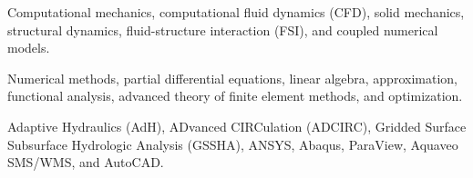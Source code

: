 \documentclass[letterpaper,10pt]{article}
\begin{document}
      \resumeItemListEnd

      \resumeItemListStart
          {Computational mechanics, computational fluid dynamics (CFD), solid
          mechanics, structural dynamics, fluid-structure interaction (FSI), and
          coupled numerical models.}

          {Numerical methods, partial differential equations, linear algebra,
          approximation, functional analysis, advanced theory of finite element
          methods, and optimization.}

          {Adaptive Hydraulics (AdH), ADvanced CIRCulation (ADCIRC), Gridded
          Surface Subsurface Hydrologic Analysis (GSSHA), ANSYS, Abaqus,
          ParaView, Aquaveo SMS/WMS, and AutoCAD.}
      \resumeItemListEnd

  \resumeSubHeadingListEnd

\vspace{-424.70pt}
\end{document}
